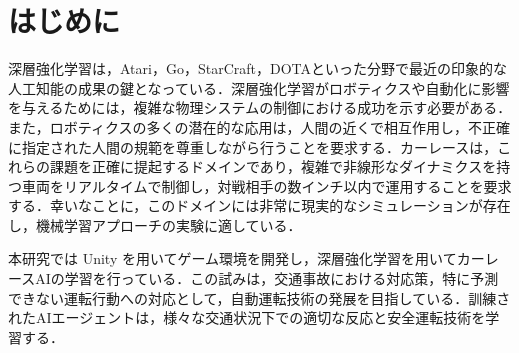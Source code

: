 \section{はじめに}
深層強化学習は，Atari，Go，StarCraft，DOTAといった分野で最近の印象的な人工知能の成果の鍵となっている．深層強化学習がロボティクスや自動化に影響を与えるためには，複雑な物理システムの制御における成功を示す必要がある．また，ロボティクスの多くの潜在的な応用は，人間の近くで相互作用し，不正確に指定された人間の規範を尊重しながら行うことを要求する．カーレースは，これらの課題を正確に提起するドメインであり，複雑で非線形なダイナミクスを持つ車両をリアルタイムで制御し，対戦相手の数インチ以内で運用することを要求する．幸いなことに，このドメインには非常に現実的なシミュレーションが存在し，機械学習アプローチの実験に適している\cite{Gran-Turismo-Sophy}．

本研究では Unity を用いてゲーム環境を開発し，深層強化学習を用いてカーレースAIの学習を行っている．この試みは，交通事故における対応策，特に予測できない運転行動への対応として，自動運転技術の発展を目指している．訓練されたAIエージェントは，様々な交通状況下での適切な反応と安全運転技術を学習する．

